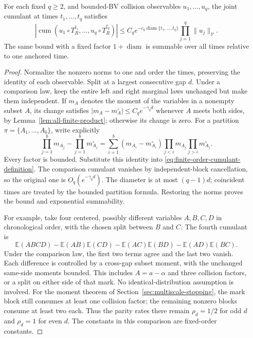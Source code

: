 \begin{lemma}
\label{lem:heterogeneous-cumulant-comparison}
For each fixed $q\ge2$, and bounded-BV collision observables
$u_1,\ldots,u_q$, the joint cumulant at times $t_1,\ldots,t_q$
satisfies
\begin{equation}\label{eq:heterogeneous-cumulant-comparison}
 |\operatorname{cum}(u_1\circ T_R^{t_1},\ldots,u_q\circ T_R^{t_q})|
 \le C_q e^{-c_q\operatorname{diam}\{t_1,\ldots,t_q\}}
                     \prod_{j=1}^q\|u_j\|_{\mathcal V}.
\end{equation}
The same bound with a fixed factor $1+\operatorname{diam}$ is
summable over all times relative to one anchored time.
\end{lemma}
\begin{proof}
Normalize the nonzero norms to one and order the times, preserving
the identity of each observable. Split at a largest consecutive gap
$d$. Under a comparison law, keep the entire left and right marginal
laws unchanged but make them independent. If $m_A$ denotes the moment
of the variables in a nonempty subset $A$, its change satisfies
$|m_A-m_A^\circ|\le C_qe^{-\gamma_qd}$ whenever $A$ meets both
sides, by Lemma~\ref{lem:all-finite-product}; otherwise its change is
zero. For a partition $\pi=\{A_1,\ldots,A_b\}$, write explicitly
\[
 \prod_{j=1}^b m_{A_j}-\prod_{j=1}^b m_{A_j}^\circ
 =\sum_{i=1}^b(m_{A_i}-m_{A_i}^\circ)
     \prod_{j<i}m_{A_j}\prod_{j>i}m_{A_j}^\circ.
\]
Every factor is bounded. Substitute this identity into
\eqref{eq:finite-order-cumulant-definition}. The comparison cumulant
vanishes by independent-block cancellation, so the original one is
$O_q(e^{-\gamma_qd})$. The diameter is at most $(q-1)d$; coincident
times are treated by the bounded partition formula. Restoring the
norms proves the bound and exponential summability.

For example, take four centered, possibly different variables
$A,B,C,D$ in chronological order, with the chosen split between
$B$ and $C$. The fourth cumulant is
\[
 \mathbb E(ABCD)-\mathbb E(AB)\mathbb E(CD)
 -\mathbb E(AC)\mathbb E(BD)-\mathbb E(AD)\mathbb E(BC).
\]
Under the comparison law, the first two terms agree and the last
two vanish. Each difference is controlled by a cross-gap subset
moment, with the unchanged same-side moments bounded. This includes
$A=a-\alpha$ and three collision factors, or a split on either side
of that mark. No identical-distribution assumption is involved.
For the moment theorem of Section~\ref{sec:multiscale-stopping},
the mark block still consumes at least one collision factor; the
remaining nonzero blocks consume at least two each. Thus the parity
rates there remain $\rho_d=1/2$ for odd $d$ and $\rho_d=1$ for even
$d$. The constants in this comparison are fixed-order constants.
\end{proof}

